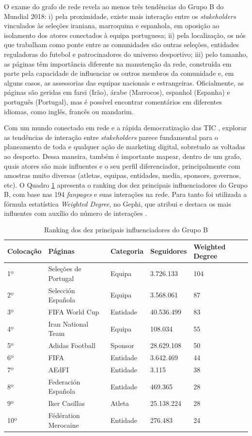 \documentclass{textolivre}
\begin{document}
O exame do grafo de rede revela ao menos três tendências do Grupo B do Mundial 2018: i) pela proximidade, existe mais interação entre os \emph{stakeholders} vinculados às seleções iraniana, marroquina e espanhola, em oposição ao isolamento dos atores conectados à equipa portuguesa; ii) pela localização, os nós que trabalham como ponte entre as comunidades são outras seleções, entidades reguladoras do futebol e patrocinadores do universo desportivo; iii) pelo tamanho, as páginas têm importância diferente na manutenção da rede, construída em parte pela capacidade de influenciar os outros membros da comunidade e, em alguns casos, as assessorias das equipas nacionais e estrangeiras. Oficialmente, as páginas são geridas em farsi (Irão), árabe (Marrocos), espanhol (Espanha) e português (Portugal), mas é possível encontrar comentários em diferentes idiomas, como inglês, francês ou mandarim.

Com um mundo conectado em rede e a rápida democratização das TIC \cite{castells2009, castells2007}, explorar as tendências de interação entre \emph{stakeholders} parece fundamental para o planeamento de toda e qualquer ação de marketing digital, sobretudo as voltadas ao desporto. Dessa maneira, também é importante mapear, dentro de um grafo, quais atores são mais influentes e o seu perfil diferenciador, principalmente com amostras muito diversas (atletas, equipas, entidades, media, sponsors, governos, etc). O Quadro \ref{tab3} apresenta o ranking dos dez principais influenciadores do Grupo B, com base nas 194 \emph{fanpages} e suas interações na rede. Para tanto foi utilizada a fórmula estatística \emph{Weighted Degree}, no Gephi, que atribui e destaca os mais influentes com auxílio do número de interações \cite{barabasi2016}.

\begin{table}[htpb]
\caption{Ranking dos dez principais influenciadores do Grupo B}
\label{tab3}
\centering
\begin{tabular}{lllll}
\toprule
Colocação & Páginas & Categoria & Seguidores & Weighted Degree
\\
\midrule
1º & Seleções de Portugal & Equipa & 3.726.133 & 104
\\
2º & Selección Española & Equipa & 3.568.061 & 87
\\
3º & FIFA World Cup & Entidade & 40.536.499 & 83
\\
4º & Iran National Team & Equipa & 108.034 & 55
\\
5º & Adidas Football & Sponsor & 28.629.108 & 50
\\
6º & FIFA & Entidade & 3.642.469 & 44
\\
7º & AEdFI & Entidade & 3.115 & 38
\\
8º & Federación Española & Entidade & 469.365 & 28
\\
9º & Iker Casillas & Atleta & 25.138.224 & 28
\\
10º & Fédération Merocaine & Entidade & 276.483 & 24
\\
\bottomrule
\end{tabular}
\centering
{}
\end{table}
 
\end{document}
